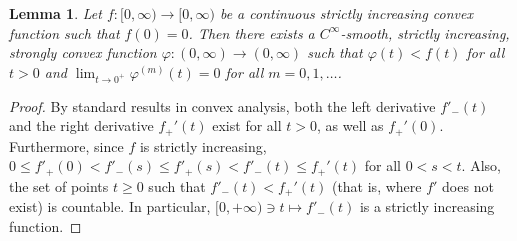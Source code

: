 \documentclass[12pt]{amsart}
\newtheorem{lemma}[theorem]{Lemma}
\theoremstyle{definition}
\theoremstyle{remark}
\numberwithin{equation}{section}
\begin{document}
\begin{lemma}\label{Lem:convex-smooth-below}
{Let $f:[0,\infty)\to [0,\infty)$ be a continuous strictly increasing convex function such that $f(0)=0$. Then there exists a $C^\infty$-smooth, strictly increasing, strongly convex function $\varphi:(0,\infty)\to (0,\infty)$ such that $\varphi(t)<f(t)$ for all $t>0$ and $\lim_{t\to 0^+}\varphi^{(m)}(t)=0$ for all $m=0,1,\ldots$.}
\end{lemma}
\begin{proof}
By standard results in convex analysis,  both the left derivative $f'_-(t)$ and the right  derivative $f_+'(t)$  exist for all $t> 0$, as well as $f_+'(0)$. Furthermore, since $f$ is strictly increasing, $0\leq f'_+(0)<f'_-(s)\leq f'_+(s)<f'_-(t)\leq f_+'(t)$ for all $0<s<t$.  Also, the set of points $t\geq 0$ such that $f'_-(t)<f_+'(t)$ (that is, where $f'$ does not exist) is countable. In particular, $[0,+\infty)\ni t\mapsto f'_-(t)$ is a strictly increasing function. 


\end{proof}
\end{document}
